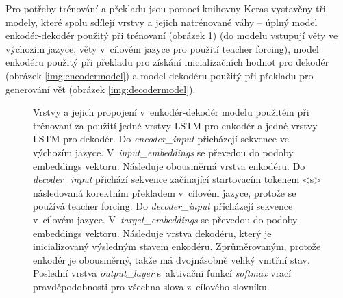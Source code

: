 Pro potřeby trénování a překladu jsou pomocí knihovny Keras vystavěny tři modely, které spolu sdílejí vrstvy a jejich natrénované váhy -- úplný model enkodér-dekodér použitý při trénovaní (obrázek \ref{img:model}) (do modelu vstupují věty ve výchozím jazyce, věty v~cílovém jazyce pro použití teacher forcing), model enkodéru použitý při překladu pro získání inicializačních hodnot pro dekodér (obrázek \ref{img:encodermodel}) a model dekodéru použitý při překladu pro generování vět (obrázek \ref{img:decodermodel}).


\begin{figure}[H]
    \begin{center}
    \end{center}
	\caption{Vrstvy a jejich propojení v~enkodér-dekodér modelu použitém při trénovaní za použití jedné vrstvy LSTM pro enkodér a jedné vrstvy LSTM pro dekodér. Do \emph{encoder\_input} přicházejí sekvence ve výchozím jazyce. V~\emph{input\_embeddings} se převedou do podoby embeddings vektoru. Následuje obousměrná vrstva enkodéru. Do \emph{decoder\_input} přichází sekvence začínající startovacím tokenem <s> následovaná korektním překladem v~cílovém jazyce, protože se používá teacher forcing. Do \emph{decoder\_input} přicházejí sekvence v~cílovém jazyce. V~\emph{target\_embeddings} se převedou do podoby embeddings vektoru. Následuje vrstva dekodéru, který je inicializovaný výsledným stavem enkodéru. Zprůměrovaným, protože enkodér je obousměrný, takže má dvojnásobně veliký vnitřní stav. Poslední vrstva \emph{output\_layer} s~aktivační funkcí \emph{softmax} vrací pravděpodobnosti pro všechna slova z~cílového slovníku.}
	\label{img:model}
\end{figure}

